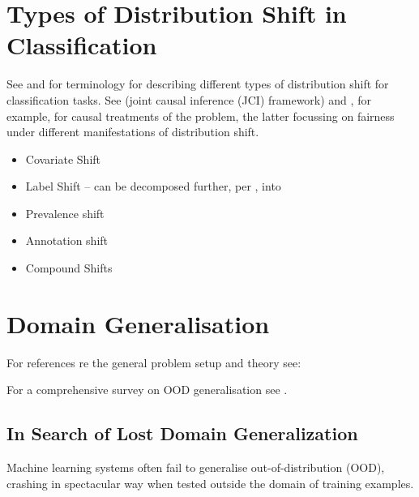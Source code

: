 \section{Types of Distribution Shift in Classification}

See \cite{moreno2012unifying} and \cite{castro2020causality} for terminology for describing
different types of distribution shift for classification tasks.
See \cite{mooij2020joint} (joint causal inference (JCI) framework) and \cite{schrouffdiagnosing}, for example, for causal treatments of the
problem, the latter focussing on fairness under different manifestations of distribution shift.
\itemi\begin{itemize}
        \item Covariate Shift
        \item Label Shift -- can be decomposed further, per \cite{castro2020causality}, into
          \item Prevalence shift
          \item Annotation shift
        \item Compound Shifts
\end{itemize}


\section{Domain Generalisation}

For references re the general problem setup and theory see:
\citet{gulrajani2020search, krueger2021out, arjovskyinvariant, ahuja2020invariant,
weber2022certifying, rosenfeld2020risks}

For a comprehensive survey on OOD generalisation see  \citet{shen2021towards}.

\subsection{In Search of Lost Domain Generalization \citep{gulrajani2020search}}
Machine learning systems often fail to generalise out-of-distribution (OOD), crashing in 
spectacular way when tested outside the domain of training examples.

